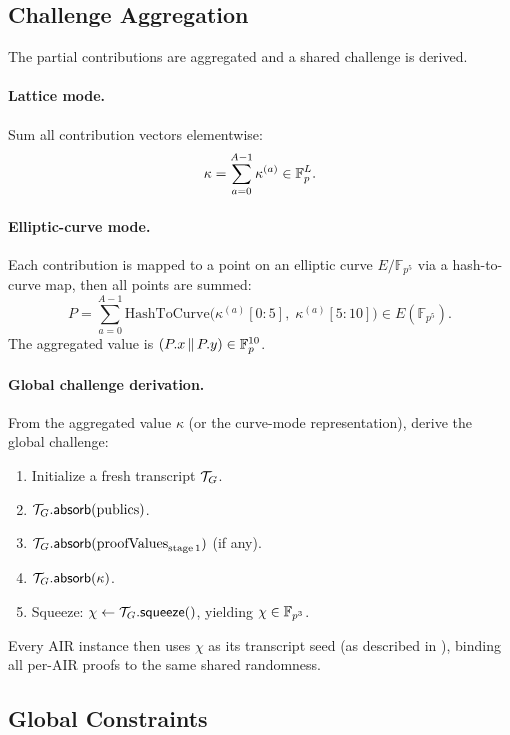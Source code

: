 \subsection{Challenge Aggregation}
\label{sec:aggregation}

The partial contributions are aggregated and a shared challenge is derived.

\paragraph{Lattice mode.}
Sum all contribution vectors elementwise:
\[
  \kappa = \sum_{a=0}^{A-1} \kappa^{(a)} \in \mathbb{F}_p^L.
\]

\paragraph{Elliptic-curve mode.}
Each contribution is mapped to a point on an elliptic curve
$E / \mathbb{F}_{p^5}$ via a hash-to-curve map,
then all points are summed:
\[
  P = \sum_{a=0}^{A-1} \mathrm{HashToCurve}\bigl(\kappa^{(a)}[0\!:\!5],\; \kappa^{(a)}[5\!:\!10]\bigr)
  \in E(\mathbb{F}_{p^5}).
\]
The aggregated value is $(P.x \,\|\, P.y) \in \mathbb{F}_p^{10}$.

\paragraph{Global challenge derivation.}
From the aggregated value $\kappa$ (or the curve-mode representation),
derive the global challenge:
\begin{enumerate}[label=(\roman*)]
  \item Initialize a fresh transcript $\mathcal{T}_G$.
  \item $\mathcal{T}_G.\textsf{absorb}(\mathrm{publics})$.
  \item $\mathcal{T}_G.\textsf{absorb}(\mathrm{proofValues}_{\mathrm{stage\,1}})$ (if any).
  \item $\mathcal{T}_G.\textsf{absorb}(\kappa)$.
  \item Squeeze: $\chi \leftarrow \mathcal{T}_G.\textsf{squeeze}()$, yielding $\chi \in \mathbb{F}_{p^3}$.
\end{enumerate}

Every AIR instance then uses $\chi$ as its transcript seed
(as described in ),
binding all per-AIR proofs to the same shared randomness.

\subsection{Global Constraints}
\label{sec:global-constraints}

